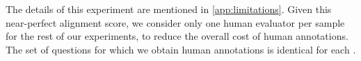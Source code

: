 The details of this experiment are mentioned in \cref{app:limitations}.
Given this near-perfect alignment score, we consider only one human evaluator per sample for the rest of our experiments, to reduce the overall cost of human annotations. 
The set of questions for which we obtain human annotations is identical for each \evaluatormodel.
%


%  


